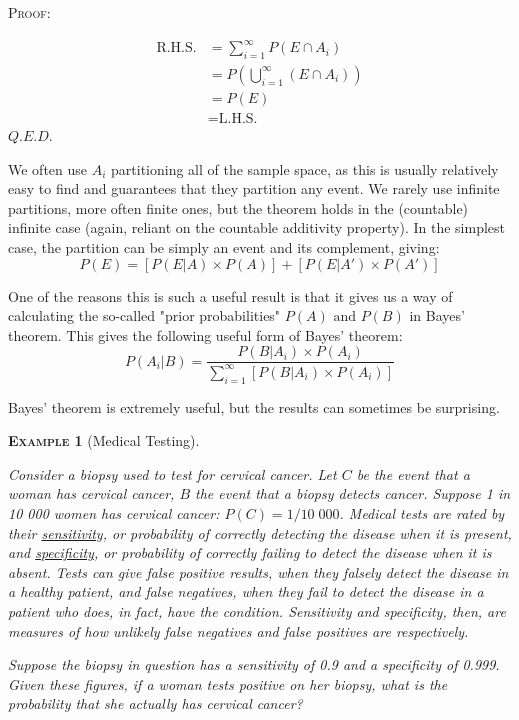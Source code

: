\documentclass[12pt,a4paper]{article}
\newtheorem{example}{\textsc{Example}}[section]
\begin{document}
\textsc{Proof:}\par
\vspace{12pt}
\begin{align*}
\text{R.H.S.} &= \sum_{i=1}^{\infty}P(E \cap A_i)\\
&= P\left(\bigcup_{i=1}^{\infty}(E\cap A_i)\right)\\
&= P(E)\\
&= \text{L.H.S.}
\end{align*}
\hfill $Q.E.D.$


We often use $A_i$ partitioning all of the sample space, as this is usually relatively easy to find and guarantees that they partition any event. We rarely use infinite partitions, more often finite ones, but the theorem holds in the (countable) infinite case (again, reliant on the countable additivity property). In the simplest case, the partition can be simply an event and its complement, giving:
$$P(E) =[ P(E|A) \times P(A)] + [P(E|A') \times P(A')]$$

One of the reasons this is such a useful result is that it gives us a way of calculating the so-called "prior probabilities" $P(A) \text{ and } P(B)$ in Bayes' theorem. This gives the following useful form of Bayes' theorem:
$$P(A_i|B) = \frac{P(B|A_i) \times P(A_i)}{\sum\limits_{i=1}^{\infty}[P(B|A_i) \times P(A_i)]}$$\par
\vspace{12pt}

\noindent Bayes' theorem is extremely useful, but the results can sometimes be surprising.

\begin{example}[Medical Testing]$\;$\par
\vspace{12pt}

Consider a biopsy used to test for cervical cancer. Let $C$ be the event that a woman has cervical cancer, $B$ the event that a biopsy detects cancer. Suppose 1 in 10 000 women has cervical cancer: $P(C) = 1/10\;000$. Medical tests are rated by their \underline{sensitivity}, or probability of correctly detecting the disease when it is present, and \underline{specificity}, or probability of correctly failing to detect the disease when it is absent. Tests can give false positive results, when they falsely detect the disease in a healthy patient, and false negatives, when they fail to detect the disease in a patient who does, in fact, have the condition. Sensitivity and specificity, then, are measures of how unlikely false negatives and false positives are respectively.

\indent Suppose the biopsy in question has a sensitivity of 0.9 and a specificity of 0.999. Given these figures, if a woman tests positive on her biopsy, what is the probability that she actually has cervical cancer?
\end{example}
\end{document}
